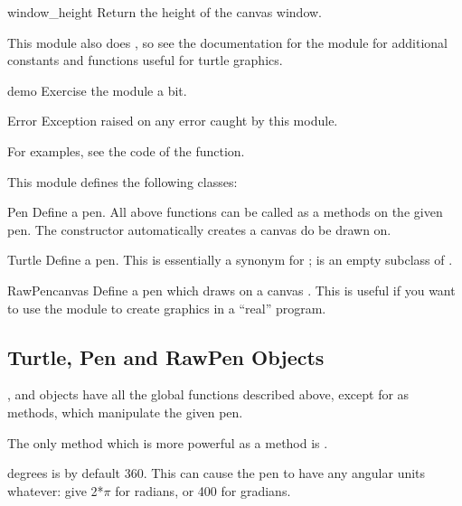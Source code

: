 \begin{funcdesc}{window\_height}{}
Return the height of the canvas window.
\end{funcdesc}

This module also does , so see the
documentation for the  module for additional constants
and functions useful for turtle graphics.

\begin{funcdesc}{demo}{}
Exercise the module a bit.
\end{funcdesc}

\begin{excdesc}{Error}
Exception raised on any error caught by this module.
\end{excdesc}

For examples, see the code of the  function.

This module defines the following classes:

\begin{classdesc}{Pen}{}
Define a pen. All above functions can be called as a methods on the given
pen. The constructor automatically creates a canvas do be drawn on.
\end{classdesc}

\begin{classdesc}{Turtle}{}
Define a pen. This is essentially a synonym for ;
 is an empty subclass of .
\end{classdesc}

\begin{classdesc}{RawPen}{canvas}
Define a pen which draws on a canvas . This is useful if 
you want to use the module to create graphics in a ``real'' program.
\end{classdesc}

\subsection{Turtle, Pen and RawPen Objects \label{pen-rawpen-objects}}

,  and  objects have all the
global functions described above, except for  as
methods, which manipulate the given pen.

The only method which is more powerful as a method is
.

\begin{methoddesc}{degrees}{}
 is by default 360. This can cause the pen to have any
angular units whatever: give  2*$\pi$ for radians, or
400 for gradians.
\end{methoddesc}
